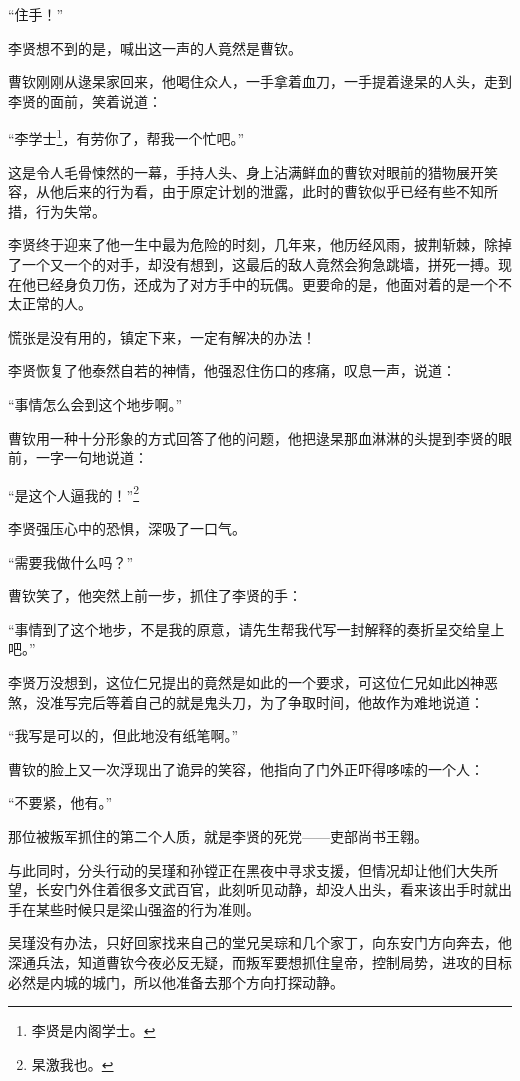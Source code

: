 \begin{multicols}{\theparacolNo}
		“住手！”

		李贤想不到的是，喊出这一声的人竟然是曹钦。

		曹钦刚刚从逯杲家回来，他喝住众人，一手拿着血刀，一手提着逯杲的人头，走到李贤的面前，笑着说道：

		“李学士\footnote{李贤是内阁学士。}，有劳你了，帮我一个忙吧。”

		这是令人毛骨悚然的一幕，手持人头、身上沾满鲜血的曹钦对眼前的猎物展开笑容，从他后来的行为看，由于原定计划的泄露，此时的曹钦似乎已经有些不知所措，行为失常。

		李贤终于迎来了他一生中最为危险的时刻，几年来，他历经风雨，披荆斩棘，除掉了一个又一个的对手，却没有想到，这最后的敌人竟然会狗急跳墙，拼死一搏。现在他已经身负刀伤，还成为了对方手中的玩偶。更要命的是，他面对着的是一个不太正常的人。

		慌张是没有用的，镇定下来，一定有解决的办法！

		李贤恢复了他泰然自若的神情，他强忍住伤口的疼痛，叹息一声，说道：

		“事情怎么会到这个地步啊。”

		曹钦用一种十分形象的方式回答了他的问题，他把逯杲那血淋淋的头提到李贤的眼前，一字一句地说道：

		“是这个人逼我的！”\footnote{杲激我也。}

		李贤强压心中的恐惧，深吸了一口气。

		“需要我做什么吗？”

		曹钦笑了，他突然上前一步，抓住了李贤的手：

		“事情到了这个地步，不是我的原意，请先生帮我代写一封解释的奏折呈交给皇上吧。”

		李贤万没想到，这位仁兄提出的竟然是如此的一个要求，可这位仁兄如此凶神恶煞，没准写完后等着自己的就是鬼头刀，为了争取时间，他故作为难地说道：

		“我写是可以的，但此地没有纸笔啊。”

		曹钦的脸上又一次浮现出了诡异的笑容，他指向了门外正吓得哆嗦的一个人：

		“不要紧，他有。”

		那位被叛军抓住的第二个人质，就是李贤的死党——吏部尚书王翱。

		与此同时，分头行动的吴瑾和孙镗正在黑夜中寻求支援，但情况却让他们大失所望，长安门外住着很多文武百官，此刻听见动静，却没人出头，看来该出手时就出手在某些时候只是梁山强盗的行为准则。

		吴瑾没有办法，只好回家找来自己的堂兄吴琮和几个家丁，向东安门方向奔去，他深通兵法，知道曹钦今夜必反无疑，而叛军要想抓住皇帝，控制局势，进攻的目标必然是内城的城门，所以他准备去那个方向打探动静。


\end{multicols}

